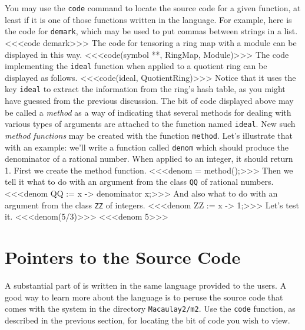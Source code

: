 You may use the \texttt{code} command to locate the source code for a given
function, at least if it is one of those functions written in the \Mtwo
language.  For example, here is the code for {\tt demark}, which may be used
to put commas between strings in a list.
<<<code demark>>>
The code for tensoring a ring map with a module can be displayed in this way.
<<<code(symbol **, RingMap, Module)>>>
The code implementing the {\tt ideal} function when applied to a
quotient ring can be displayed as follows.
<<<code(ideal, QuotientRing)>>>
Notice that it uses the key {\tt ideal} to extract the information from the
ring's hash table, as you might have guessed from the previous discussion.
The bit of code displayed above may be called a {\sl method} as
a way of indicating that several methods for dealing with various types of
arguments are attached to the function named {\tt ideal}.  New such {\sl
  method functions} may be created with the function {\tt method}.  Let's
illustrate that with an example: we'll write a function called {\tt denom}
which should produce the denominator of a rational number.  When applied to
an integer, it should return 1.  First we create the method function.
<<<denom = method();>>>
Then we tell it what to do with an argument from the class {\tt QQ} of rational numbers.
<<<denom QQ := x -> denominator x;>>>
And also what to do with an argument from the class {\tt ZZ} of integers.
<<<denom ZZ := x -> 1;>>>
Let's test it.
<<<denom(5/3)>>>
<<<denom 5>>>

\section{Pointers to the Source Code}

A substantial part of \Mtwo is written in the same language provided to the
users.  A good way to learn more about the \Mtwo language is to peruse the
source code that comes with the system in the directory {\tt Macaulay2/m2}.
Use the {\tt code} function, as described in the previous section, for
locating the bit of code you wish to view.

